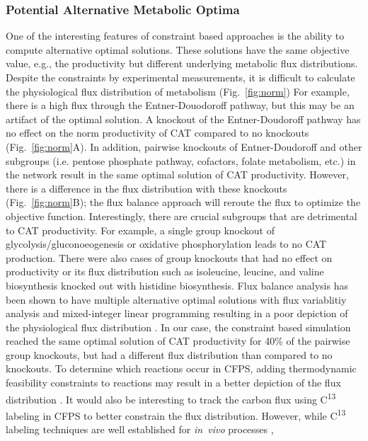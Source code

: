 \documentclass[journal=asbcd6,manuscript=article]{achemso}
\begin{document}
\subsubsection{Potential Alternative Metabolic Optima}
One of the interesting features of constraint based approaches is the ability to compute alternative optimal solutions.
These solutions have the same objective value, e.g., the productivity but different underlying metabolic flux distributions.
Despite the constraints by experimental measurements, it is difficult to calculate the physiological flux distribution of metabolism (Fig.~\ref{fig:norm})
For example, there is a high flux through the Entner-Douodoroff pathway, but this may be an artifact of the optimal solution.
A knockout of the Entner-Doudoroff pathway has no effect on the norm productivity of CAT compared to no knockouts (Fig.~\ref{fig:norm}A).
In addition, pairwise knockouts of Entner-Doudoroff and other subgroups (i.e. pentose phosphate pathway, cofactors, folate metabolism, etc.) in the network result in the same optimal solution of CAT productivity.
However, there is a difference in the flux distribution with these knockouts (Fig.~\ref{fig:norm}B);
the flux balance approach will reroute the flux to optimize the objective function.
Interestingly, there are crucial subgroups that are detrimental to CAT productivity.
For example, a single group knockout of glycolysis/gluconoeogenesis or oxidative phosphorylation leads to no CAT production.
There were also cases of group knockouts that had no effect on productivity or its flux distribution such as isoleucine, leucine, and valine biosynthesis knocked out with histidine biosynthesis.
Flux balance analysis has been shown to have multiple alternative optimal solutions with flux variablitiy analysis and mixed-integer linear programming resulting in a poor depiction of the physiological flux distribution \cite{LEE2000711, Mahadevan2003264, Schuetz119}.
In our case, the constraint based simulation reached the same optimal solution of CAT productivity for 40\% of the pairwise group knockouts, but had a different flux distribution than compared to no knockouts.
To determine which reactions occur in CFPS, adding thermodynamic feasibility constraints to reactions may result in a better depiction of the flux distribution \cite{Henry:2007,Hamilton:2013}.
It would also be interesting to track the carbon flux using C\textsuperscript{13} labeling in CFPS to better constrain the flux distribution.
However, while C\textsuperscript{13} labeling techniques are well established for \emph{in~vivo} processes \cite{Zamboni:2009},
\end{document}
